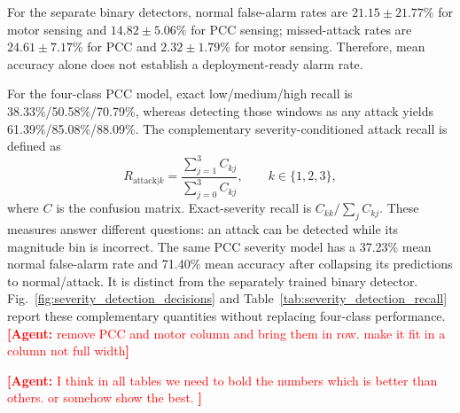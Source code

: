 \documentclass[letterpaper,journal]{IEEEtran}
\newcommand{\agent}[1]{%
    \textcolor{red}{\textbf{[Agent:} #1\textbf{]}}%
}
\begin{document}
For the separate binary detectors, normal false-alarm rates are $21.15\pm21.77\%$ for motor sensing and $14.82\pm5.06\%$ for PCC sensing; missed-attack rates are $24.61\pm7.17\%$ for PCC and $2.32\pm1.79\%$ for motor sensing. Therefore, mean accuracy alone does not establish a deployment-ready alarm rate.

For the four-class PCC model, exact low/medium/high recall is 38.33\%/50.58\%/70.79\%, whereas detecting those windows as any attack yields 61.39\%/85.08\%/88.09\%. The complementary severity-conditioned attack recall is defined as
\begin{equation}
R_{\mathrm{attack}|k}=\frac{\sum_{j=1}^{3}C_{kj}}{\sum_{j=0}^{3}C_{kj}},\qquad k\in\{1,2,3\},
\label{eq:severity_conditioned_detection}
\end{equation}
where $C$ is the confusion matrix. Exact-severity recall is $C_{kk}/\sum_j C_{kj}$. These measures answer different questions: an attack can be detected while its magnitude bin is incorrect. The same PCC severity model has a 37.23\% mean normal false-alarm rate and 71.40\% mean accuracy after collapsing its predictions to normal/attack. It is distinct from the separately trained binary detector. Fig.~\ref{fig:severity_detection_decisions} and Table~\ref{tab:severity_detection_recall} report these complementary quantities without replacing four-class performance.
\agent{remove PCC and motor column and bring them in row. make it fit in a column not full width}
\agent{I think in all tables we need to bold the numbers which is better than others. or somehow show the best. }
\end{document}
